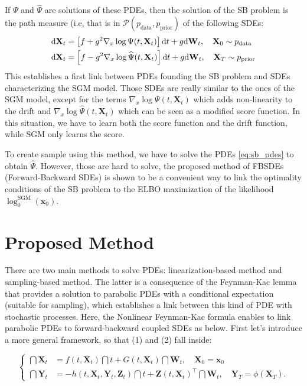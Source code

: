 \documentclass{article}
\begin{document}
If $\Psi$ and $\widehat\Psi$ are solutions of these PDEs, then the solution of the SB problem is the path measure (i.e, that is in $\mathcal{P}(p_\mathrm{data}, p_\mathrm{prior})$ of the following SDEs:
\begin{equation}
    \label{eq:sb_sdes}
\begin{aligned}
    \mathrm{d}\mathbf{X}_t & = \left\lbrack f+g^2\nabla_x\log\Psi(t,\mathbf{X}_t) \right\rbrack\mathrm{d} t + g\mathrm{d} \mathbf{W}_t, \quad \mathbf{X}_0 \sim p_\mathrm{data}\\
    \mathrm{d} \mathbf{X}_t & = \left\lbrack f-g^2\nabla_x\log\widehat\Psi(t,\mathbf{X}_t) \right\rbrack\mathrm{d} t + g \mathrm{d} \mathbf{W}_t, \quad \mathbf{X}_T \sim p_\mathrm{prior}
\end{aligned}
\end{equation}
This establishes a first link between PDEs founding the SB problem and SDEs characterizing the SGM model.
Those SDEs are really similar to the ones of the SGM model, except for the terms $\nabla_x\log\Psi(t,\mathbf{X}_t)$ which adds non-linearity to the drift and $\nabla_x\log\widehat\Psi(t,\mathbf{X}_t)$ which can be seen as a modified score function.
In this situation, we have to learn both the score function and the drift function, while SGM only learns the score.

To create sample using this method, we have to solve the PDEs \eqref{eq:sb_pdes} to obtain $\widehat\Psi$.
However, those are hard to solve, the proposed method of FBSDEs (Forward-Backward SDEs) is shown to be a convenient way to link the optimality conditions of the SB problem to the ELBO maximization of the likelihood $\log_0^\mathrm{SGM}(\mathbf{x}_0)$.

\section{Proposed Method}
There are two main methods to solve PDEs: linearization-based method and sampling-based method. The latter is a consequence of the Feynman-Kac lemma that provides a solution to parabolic PDEs with a conditional expectation (suitable for sampling), which establishes a link between this kind of PDE with stochastic processes. Here, the Nonlinear Feynman-Kac formula enables to link parabolic PDEs to forward-backward coupled SDEs as below. First let's introduce a more general framework, so that (1) and (2) fall inside:

\begin{equation}\label{eq:fbsde1}
\left\{\begin{array}{ll}
   \dint\mathbf{X}_t  & = f(t,\mathbf{X}_t)\dint t + G(t,\mathbf{X}_t)\dint\mathbf{W}_t, \quad \mathbf{X}_0 =\mathbf{x}_0  \\
   \dint\mathbf{Y}_t & = - h(t,\mathbf{X}_t, \mathbf{Y}_t,\mathbf{Z}_t)\dint t + \mathbf{Z}(t,\mathbf{X}_t)^\top \dint\mathbf{W}_t,\quad \mathbf{Y}_T = \phi(\mathbf{X}_T).
\end{array}\right.
\end{equation}
\end{document}
